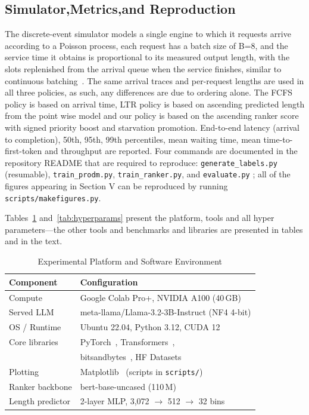 \documentclass[conference]{IEEEtran}
\begin{document}
\subsection{ Simulator,Metrics,and Reproduction}\label{SCM}
The discrete-event simulator models a single engine to which it requests arrive according to a Poisson process, each request has a batch size of B=8, and the service time it obtains is proportional to its measured output length, with the slots replenished from the arrival queue when the service finishes, similar to continuous batching~\cite{yu2022orca}. The same arrival traces and per-request lengths are used in all three policies, as such, any differences are due to ordering alone. The FCFS policy is based on arrival time, LTR policy is based on ascending predicted length from the point wise model and our policy is based on the ascending ranker score with signed priority boost and starvation promotion. End-to-end latency (arrival to completion), 50th, 95th, 99th percentiles, mean waiting time, mean time-to-first-token and throughput are reported.
Four commands are documented in the repository README that are required to reproduce: \texttt{generate\_labels.py} (resumable), \texttt{train\_prodm.py}, 
\texttt{train\_ranker.py}, and \texttt{evaluate.py} ; all of the figures appearing in Section V can be reproduced by running \texttt{scripts/makefigures.py}.

Tables~\ref{tab:platform} and~\ref{tab:hyperparams} present the platform, tools and all hyper parameters—the other tools and benchmarks and libraries are presented in tables and in the text.

\begin{table}[!t]
\caption{Experimental Platform and Software Environment}
\label{tab:platform}
\centering
\begin{tabular}{@{}ll@{}}
\toprule
\textbf{Component} & \textbf{Configuration} \\
\midrule
Compute & Google Colab Pro+, NVIDIA A100 (40\,GB) \\
Served LLM & meta-llama/Llama-3.2-3B-Instruct (NF4 4-bit) \\
OS / Runtime & Ubuntu 22.04, Python 3.12, CUDA 12 \\
Core libraries & PyTorch~\cite{paszke2019pytorch}, Transformers~\cite{wolf2020transformers}, \\
 & bitsandbytes~\cite{dettmers2023qlora}, HF Datasets \\
Plotting & Matplotlib~\cite{hunter2007matplotlib} (scripts in \texttt{scripts/}) \\
Ranker backbone & bert-base-uncased (110\,M)~\cite{devlin2019bert} \\
Length predictor & 2-layer MLP, 3{,}072 $\rightarrow$ 512 $\rightarrow$ 32 bins \\
\bottomrule
\end{tabular}
\end{table}
\end{document}
